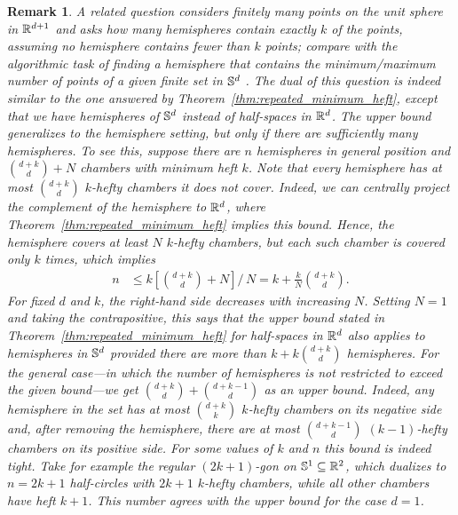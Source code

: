 \documentclass[10pt,a4paper]{article}
\newtheorem{remark}{Remark}[section]
\newcommand {\mm}[1] {\ifmmode{#1}\else{\mbox{\(#1\)}}\fi}
\theoremstyle{plain}
\newcommand{\Rspace}        {\mm{{\mathbb R}}}
\newcommand{\Sspace}        {\mm{{\mathbb S}}}
\begin{document}
\begin{remark}\label{rem:repeated_minimum_heft_sphere}
  A related question considers finitely many points on the unit sphere in $\Rspace^{d+1}$ and asks how many hemispheres contain exactly $k$ of the points, assuming no hemisphere contains fewer than $k$ points; compare with the algorithmic task of finding a hemisphere that contains the minimum/maximum number of points of a given finite set in $\Sspace^d$ \cite{JP78}.
  The dual of this question is indeed similar to the one answered by Theorem~\ref{thm:repeated_minimum_heft}, except that we have hemispheres of $\Sspace^d$ instead of half-spaces in $\Rspace^d$.
  \smallskip
  The upper bound generalizes to the hemisphere setting, but only if there are sufficiently many hemispheres.
  To see this, suppose there are $n$ hemispheres in general position and $\binom{d+k}{d} + N$ chambers with minimum heft $k$.
  Note that every hemisphere has at most $\binom{d+k}{d}$ $k$-hefty chambers it does not cover.
  Indeed, we can centrally project the complement of the hemisphere to $\Rspace^d$, where Theorem~\ref{thm:repeated_minimum_heft} implies this bound.
  Hence, the hemisphere covers at least $N$ $k$-hefty chambers, but each such chamber is covered only $k$ times, which implies
  \begin{align}
    n &\leq k \left[ \binom{d+k}{d} + N \right] / \,N = k + \frac{k}{N} \binom{d+k}{d} .
  \end{align}
  For fixed $d$ and $k$, the right-hand side decreases with increasing $N$.
  Setting $N = 1$ and taking the contrapositive, this says that the upper bound stated in Theorem~\ref{thm:repeated_minimum_heft} for half-spaces in $\Rspace^d$ also applies to hemispheres in $\Sspace^d$ provided there are more than $k + k \binom{d+k}{d}$ hemispheres.
  \smallskip
  For the general case---in which the number of hemispheres is not restricted to exceed the given bound---we get $\binom{d+k}{d} + \binom{d+k-1}{d}$ as an upper bound.
  Indeed, any hemisphere in the set has at most $\binom{d+k}{k}$ $k$-hefty chambers on its negative side and, after removing the hemisphere, there are at most $\binom{d+k-1}{d}$ $(k-1)$-hefty chambers on its positive side.
  For some values of $k$ and $n$ this bound is indeed tight.
  Take for example the regular $(2k+1)$-gon on $\Sspace^1 \subseteq \Rspace^2$, which dualizes to $n = 2k+1$ half-circles with $2k+1$ $k$-hefty chambers,
  while all other chambers have heft $k+1$.
  This number agrees with the upper bound for the case $d=1$.
  

\end{remark}
\end{document}
